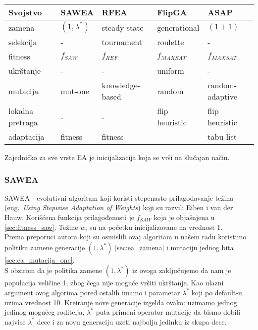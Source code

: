 \documentclass{article}
\begin{document}
\begin{table}[h!]
\centering
{}\label{tab:EA} 
\begin{tabular}{ |p{2.8cm}|p{2.3cm}|p{2.3cm}|p{2.3cm}|p{2.3cm}|}
 \hline
 Svojstvo & SAWEA & RFEA & FlipGA & ASAP \\
 \hline
 zamena & $(1, \lambda^*)$ & steady-state & generational & $(1 + 1)$ \\
 \hline
 selekcija & - & tournament & roulette & - \\
 \hline
 fitness &	$f_{SAW}$ & $f_{REF}$ & $f_{MAXSAT}$ & $f_{MAXSAT}$ \\
 \hline
 ukrštanje & - & - & uniform & - \\
 \hline
 mutacija & mut-one & knowledge-based & random & random-adaptive \\
 \hline
 lokalna pretraga & - & - & flip heuristic & flip heuristic \\
 \hline
 adaptacija & fitness & fitness &  - & tabu list \\
 \hline
\end{tabular}
\end{table}
Zajedničko za sve vrste EA je inicijalizacija koja se vrši na slučajan način.

\subsubsection{SAWEA}
\label{sec:ea_sawea}
SAWEA - evolutivni algoritam koji koristi stepenasto prilagođavanje težina (eng.~{\em Using Stepwise Adaptation of Weights}) \cite{ea_with_table, ea_without_table}koji su razvili Eiben i van der Hauw. Korišćena funkcija prilagođenosti je $f_{SAW}$  koja je objašnjena u \ref{sec:fitness_saw}. Težine $w_i$  su na početku inicijalizovane na vrednost 1. \\

Prema preporuci autora koji su osmislili ovaj algoritam u našem radu koristimo politiku zamene generacije $(1,\lambda^*)$ \ref{sec:ea_zamena} i mutaciju jednog bita \ref{sec:ea_mutacija_one}.\\

S obzirom da je politika zamene  $(1,\lambda^*)$ iz ovoga zaključujemo da nam je populacija veličine 1, zbog čega nije moguće vršiti ukrštanje. 
Kao ulazni argument ovog algorima pored ostalih imamo i parametar $\lambda^*$ koji po default-u uzima vrednost 10. Kreiranje nove generacije izgelda ovako: uzimamo jednog jedinog mogućeg roditelja, $\lambda^*$ puta primeni operator mutacije da bismo dobili najvise $\lambda^*$ dece i za novu generaciju uzeti najbolju jedinku iz skupa dece.
\end{document}

